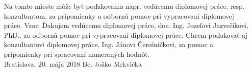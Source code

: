 \null
\vfill
\noindent
Na tomto mieste môže byť poďakovania napr. vedúcemu diplomovej práce, resp. konzultantom, za pripomienky a odbornú pomoc pri vypracovaní diplomovej práce. Vzor: Ďakujem vedúcemu diplomovej práce, doc. Ing. Jozefovi Jazvečíkovi, PhD., za odbornú pomoc pri vypracovaní diplomovej práce. Chcem poďakovať aj konzultantovi diplomovej práce, Ing. Jánovi Čerešničkovi, za pomoc a pripomienky pri spracovaní nameraných hodnôt.\\

\noindent Bratislava, 20. mája 2018 \hfill Bc. Jožko Mrkvička
\cleardoublepage 


	

